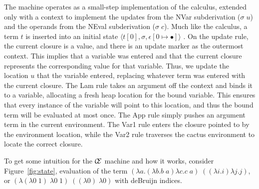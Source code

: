 The machine operates as a small-step implementation of the calculus, extended
only with a context to implement the updates from the NVar subderivation
($\sigma \; u$) and the operands from the NEval subderivation ($\sigma \; c$).
Much like the calculus, a term $t$ is inserted into an initial state $\langle
t[0], \sigma, \epsilon[0\mapsto\bullet]\rangle$ . On the update rule, the current
closure is a value, and there is an update marker as the outermost context.
This implies that a variable was entered and that the current closure
represents the corresponding value for that variable. Thus, we update the
location $u$ that the variable entered, replacing whatever term was entered
with the current closure. The Lam rule takes an argument off the context and
binds it to a variable, allocating a fresh heap location for the bound
variable. This ensures that every instance of the variable will point to this
location, and thus the bound term will be evaluated at most once. The App rule
simply pushes an argument term in the current environment. The Var1 rule enters
the closure pointed to by the environment location, while the Var2 rule
traverses the cactus environment to locate the correct closure.  

To get some intuition for the $\mathcal{\mathcal{C} \mskip -4mu \mathcal{E}}$
machine and how it works, consider Figure~\ref{fig:state}, evaluation of the
term $(\lambda a.(\lambda b.b \; a) \lambda c.c \; a) \; ((\lambda i.i)
\lambda j.j)$, or $(\lambda(\lambda0\;1)\;\lambda0\;1)\;((\lambda0)\;
\lambda0)$ with deBruijn indices.

